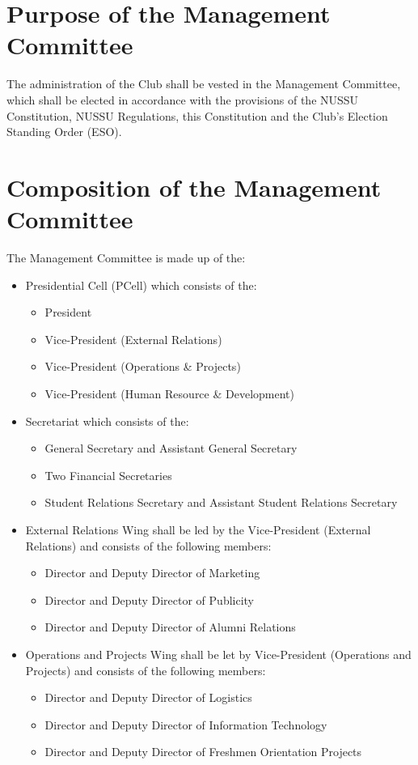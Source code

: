 
\section{Purpose of the Management Committee}
The administration of the Club shall be vested in the Management Committee, which shall be elected in accordance with the provisions of the NUSSU Constitution, NUSSU Regulations, this Constitution and the Club's Election Standing Order (ESO).

\section{Composition of the Management Committee}
The Management Committee is made up of the:
	\begin{itemize}
	\item Presidential Cell (PCell) which consists of the:
		\begin{itemize}
		\item President
		\item Vice-President (External Relations)
		\item Vice-President (Operations \& Projects)
		\item Vice-President (Human Resource \& Development)
		\end{itemize}
		
	\item Secretariat which consists of the:
		\begin{itemize}
		\item General Secretary and Assistant General Secretary
		\item Two Financial Secretaries
		\item Student Relations Secretary and Assistant Student Relations Secretary
		\end{itemize}
		
	\item External Relations Wing shall be led by the Vice-President (External Relations) and consists of the following members:
		\begin{itemize}
		\item Director and Deputy Director of Marketing
		\item Director and Deputy Director of Publicity
		\item Director and Deputy Director of Alumni Relations
		\end{itemize}
		
	\item Operations and Projects Wing shall be let by Vice-President (Operations and Projects) and consists of the following members:
		\begin{itemize}
		\item Director and Deputy Director of Logistics
		\item Director and Deputy Director of Information Technology
		\item Director and Deputy Director of Freshmen Orientation Projects
		\end{itemize}
		

\end{itemize}
